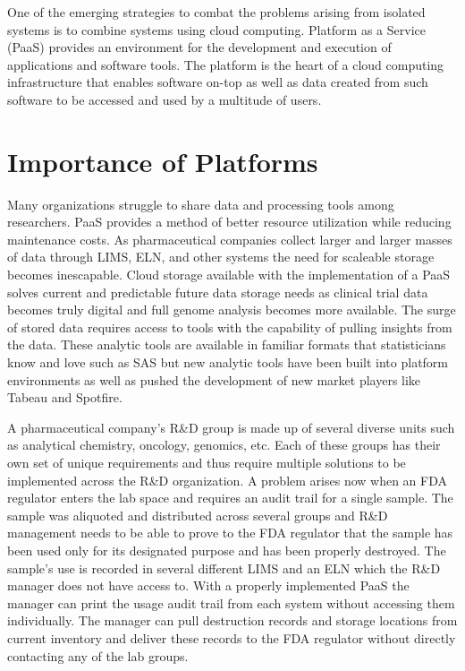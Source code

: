 \documentclass[sigconf]{acmart}
\begin{document}
One of the emerging strategies to combat the problems arising from isolated systems is to combine systems using cloud computing. Platform as a Service (PaaS) provides an environment for the development and execution of applications and software tools. The platform is the heart of a cloud computing infrastructure that enables software on-top as well as data created from such software to be accessed and used by a multitude of users\cite{Ojala}.

\section{Importance of Platforms}	
Many organizations struggle to share data and processing tools among researchers. PaaS provides a method of better resource utilization while reducing maintenance costs\cite{Oh}. As pharmaceutical companies collect larger and larger masses of data through LIMS, ELN, and other systems the need for scaleable storage becomes inescapable. Cloud storage available with the implementation of a PaaS solves current and predictable future data storage needs as clinical trial data becomes truly digital and full genome analysis becomes more available. The surge of stored data requires access to tools with the capability of pulling insights from the data. These analytic tools are available in familiar formats that statisticians know and love such as SAS but new analytic tools have been built into platform environments as well as pushed the development of new market players like Tabeau and Spotfire\cite{Talia}.

A pharmaceutical company's R\&D group is made up of several diverse units such as analytical chemistry, oncology, genomics, etc. Each of these groups has their own set of unique requirements and thus require multiple solutions to be implemented across the R\&D organization. A problem arises now when an FDA regulator enters the lab space and requires an audit trail for a single sample. The sample was aliquoted and distributed across several groups and R\&D management needs to be able to prove to the FDA regulator that the sample has been used only for its designated purpose and has been properly destroyed. The sample's use is recorded in several different LIMS and an ELN which the R\&D manager does not have access to. With a properly implemented PaaS the manager can print the usage audit trail from each system without accessing them individually. The manager can pull destruction records and storage locations from current inventory and deliver these records to the FDA regulator without directly contacting any of the lab groups. 
\end{document}
